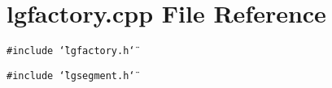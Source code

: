\section{lgfactory.cpp File Reference}
\label{lgfactory_8cpp}
{\tt \#include \char`\"{}lgfactory.h\char`\"{}}\par
{\tt \#include \char`\"{}lgsegment.h\char`\"{}}\par
